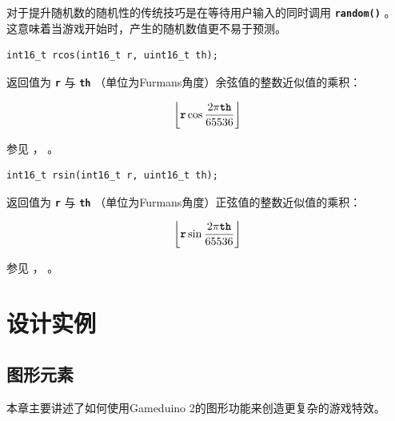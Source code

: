 \documentclass[10pt]{book}
\newcommand{\mach}[1]{\texttt{\textbf{#1}}}
\begin{document}
\begin{CJK}{UTF8}{gkai}
对于提升随机数的随机性的传统技巧是在等待用户输入的同时调用 \mach{random()} 。
这意味着当游戏开始时，产生的随机数值更不易于预测。

\newpage
{}

\begin{framed}
\begin{verbatim}
int16_t rcos(int16_t r, uint16_t th);
\end{verbatim}
\end{framed}

返回值为 \mach{r} 与 \mach{th} （单位为Furmans角度）余弦值的整数近似值的乘积：

\[
  \left\lfloor \mach{r} \cos \frac{2 \pi \mach{th}}{65536} \right\rfloor
\]

\noindent
参见  ，  。


\begin{framed}
\begin{verbatim}
int16_t rsin(int16_t r, uint16_t th);
\end{verbatim}
\end{framed}

返回值为 \mach{r} 与 \mach{th} （单位为Furmans角度）正弦值的整数近似值的乘积：

\[
  \left\lfloor \mach{r} \sin \frac{2 \pi \mach{th}}{65536} \right\rfloor
\]

\noindent
参见  ，  。

\part{设计实例}

\chapter{图形元素}

本章主要讲述了如何使用Gameduino 2的图形功能来创造更复杂的游戏特效。

\newpage

\end{CJK}
\end{document}
